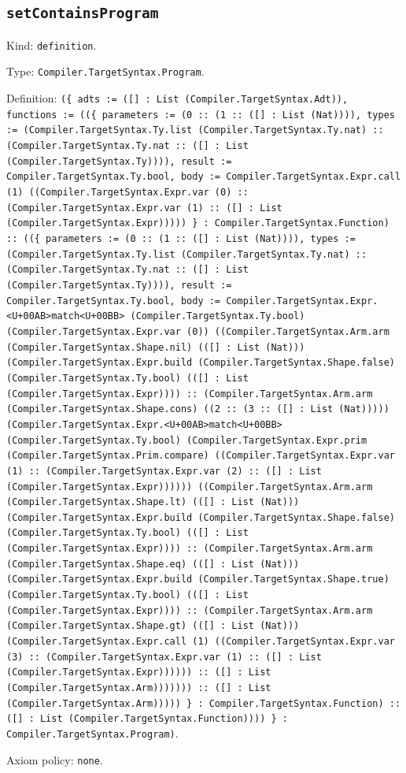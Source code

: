 \documentclass[11pt]{article}
\begin{document}
\subsection*{\texttt{setContainsProgram}}
\noindent Kind: \texttt{definition}.\par
\noindent Type: \texttt{Compiler.TargetSyntax.Program}.\par
\noindent Definition: \texttt{(\{ adts := ([] : List (Compiler.TargetSyntax.Adt)), functions := ((\{ parameters := (0 :: (1 :: ([] : List (Nat)))), types := (Compiler.TargetSyntax.Ty.list (Compiler.TargetSyntax.Ty.nat) :: (Compiler.TargetSyntax.Ty.nat :: ([] : List (Compiler.TargetSyntax.Ty)))), result := Compiler.TargetSyntax.Ty.bool, body := Compiler.TargetSyntax.Expr.call (1) ((Compiler.TargetSyntax.Expr.var (0) :: (Compiler.TargetSyntax.Expr.var (1) :: ([] : List (Compiler.TargetSyntax.Expr))))) \} : Compiler.TargetSyntax.Function) :: ((\{ parameters := (0 :: (1 :: ([] : List (Nat)))), types := (Compiler.TargetSyntax.Ty.list (Compiler.TargetSyntax.Ty.nat) :: (Compiler.TargetSyntax.Ty.nat :: ([] : List (Compiler.TargetSyntax.Ty)))), result := Compiler.TargetSyntax.Ty.bool, body := Compiler.TargetSyntax.Expr.<U+00AB>match<U+00BB> (Compiler.TargetSyntax.Ty.bool) (Compiler.TargetSyntax.Expr.var (0)) ((Compiler.TargetSyntax.Arm.arm (Compiler.TargetSyntax.Shape.nil) (([] : List (Nat))) (Compiler.TargetSyntax.Expr.build (Compiler.TargetSyntax.Shape.false) (Compiler.TargetSyntax.Ty.bool) (([] : List (Compiler.TargetSyntax.Expr)))) :: (Compiler.TargetSyntax.Arm.arm (Compiler.TargetSyntax.Shape.cons) ((2 :: (3 :: ([] : List (Nat))))) (Compiler.TargetSyntax.Expr.<U+00AB>match<U+00BB> (Compiler.TargetSyntax.Ty.bool) (Compiler.TargetSyntax.Expr.prim (Compiler.TargetSyntax.Prim.compare) ((Compiler.TargetSyntax.Expr.var (1) :: (Compiler.TargetSyntax.Expr.var (2) :: ([] : List (Compiler.TargetSyntax.Expr)))))) ((Compiler.TargetSyntax.Arm.arm (Compiler.TargetSyntax.Shape.lt) (([] : List (Nat))) (Compiler.TargetSyntax.Expr.build (Compiler.TargetSyntax.Shape.false) (Compiler.TargetSyntax.Ty.bool) (([] : List (Compiler.TargetSyntax.Expr)))) :: (Compiler.TargetSyntax.Arm.arm (Compiler.TargetSyntax.Shape.eq) (([] : List (Nat))) (Compiler.TargetSyntax.Expr.build (Compiler.TargetSyntax.Shape.true) (Compiler.TargetSyntax.Ty.bool) (([] : List (Compiler.TargetSyntax.Expr)))) :: (Compiler.TargetSyntax.Arm.arm (Compiler.TargetSyntax.Shape.gt) (([] : List (Nat))) (Compiler.TargetSyntax.Expr.call (1) ((Compiler.TargetSyntax.Expr.var (3) :: (Compiler.TargetSyntax.Expr.var (1) :: ([] : List (Compiler.TargetSyntax.Expr)))))) :: ([] : List (Compiler.TargetSyntax.Arm))))))) :: ([] : List (Compiler.TargetSyntax.Arm))))) \} : Compiler.TargetSyntax.Function) :: ([] : List (Compiler.TargetSyntax.Function)))) \} : Compiler.TargetSyntax.Program)}.\par
\noindent Axiom policy: \texttt{none}.\par
\end{document}
